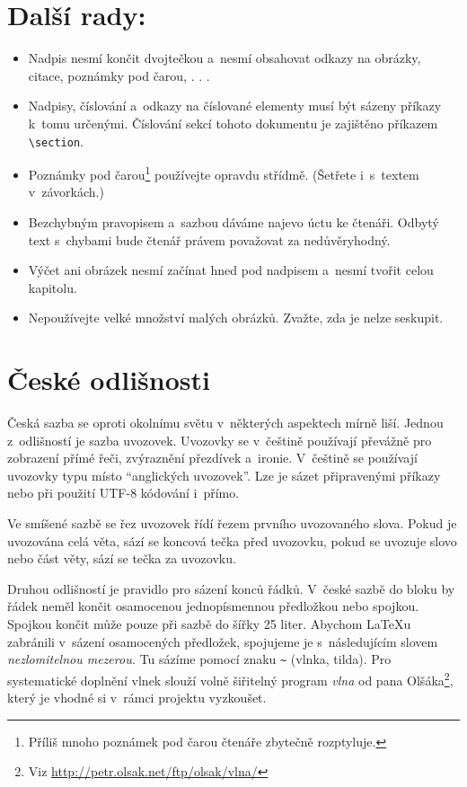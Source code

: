 \documentclass[10pt, a4paper, twocolumn]{article}
\begin{document}
\section{Další rady:}
\label{section: Dalsi rady}

\begin{itemize}
\item Nadpis nesmí končit dvojtečkou a~nesmí obsahovat
odkazy na obrázky, citace, poznámky pod čarou, . . .

\item Nadpisy, číslování a~odkazy na číslované elementy musí být sázeny příkazy k~tomu určenými.
Číslování sekcí tohoto dokumentu je zajištěno příkazem \verb|\section|.

\item Poznámky pod čarou\footnote[1]{Příliš mnoho poznámek pod čarou čtenáře zbytečně rozptyluje.} používejte opravdu střídmě.
(Šetřete i~s~textem v~závorkách.)
\item Bezchybným pravopisem a~sazbou dáváme najevo úctu ke čtenáři.
Odbytý text s~chybami bude čtenář právem považovat za nedůvěryhodný.
\item Výčet ani obrázek nesmí začínat hned pod nadpisem a~nesmí tvořit celou kapitolu.
\item Nepoužívejte velké množství malých obrázků.
Zvažte, zda je nelze seskupit.
\end{itemize}

\section{České odlišnosti}

Česká sazba se oproti okolnímu světu v~některých aspektech mírně liší.
Jednou z~odlišností je sazba uvozovek.
Uvozovky se v~češtině používají převážně pro zobrazení přímé řeči, zvýraznění přezdívek a~ironie.
V~češtině se používají uvozovky typu  místo “anglických uvozovek”.
Lze je sázet připravenými příkazy nebo při použití UTF-8 kódování i~přímo.

Ve smíšené sazbě se řez uvozovek řídí řezem prvního uvozovaného slova.
Pokud je uvozována celá věta, sází se koncová tečka před uvozovku, pokud se uvozuje slovo nebo část věty, sází se tečka za uvozovku.

Druhou odlišností je pravidlo pro sázení konců řádků.
V~české sazbě do bloku by řádek neměl končit osamocenou jednopísmennou předložkou nebo spojkou.
Spojkou  končit může pouze při sazbě do šířky 25 liter.
Abychom \LaTeX u zabránili v~sázení osamocených předložek, spojujeme je s~následujícím slovem \emph{nezlomitelnou mezerou.}
Tu sázíme pomocí znaku \verb|~| (vlnka, tilda).
Pro systematické doplnění vlnek slouží volně šiřitelný program \emph{vlna} od pana Olšáka\footnote[2]{Viz \url {http://petr.olsak.net/ftp/olsak/vlna/} }, který je vhodné si v~rámci projektu vyzkoušet.
\end{document}
